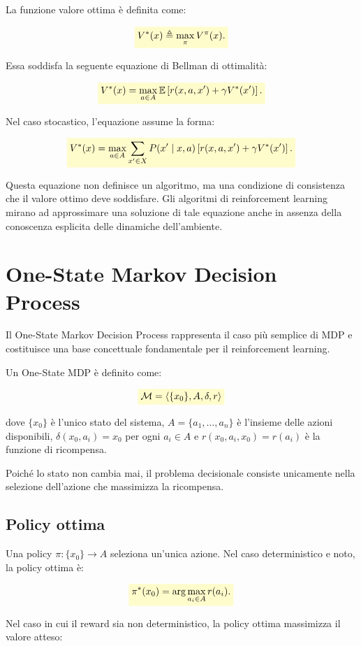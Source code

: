 \documentclass[a4paper,12pt]{report}
\newcommand{\highlight}[1]{%
\colorbox{yellow!20}{$\displaystyle #1$}%
}
\begin{document}
La funzione valore ottima è definita come:

\[
\highlight{
V^*(x) \triangleq \max_\pi V^\pi(x).}
\]

Essa soddisfa la seguente equazione di Bellman di ottimalità:

\[
\highlight{
V^*(x) =
\max_{a \in A}
\mathbb{E}\left[
r(x, a, x') + \gamma V^*(x')
\right].}
\]

Nel caso stocastico, l'equazione assume la forma:

\[
\highlight{
V^*(x) =
\max_{a \in A}
\sum_{x' \in X}
P(x' \mid x, a)
\left[
r(x, a, x') + \gamma V^*(x')
\right].}
\]

Questa equazione non definisce un algoritmo, ma una condizione di
consistenza che il valore ottimo deve soddisfare. Gli algoritmi di
reinforcement learning mirano ad approssimare una soluzione di tale
equazione anche in assenza della conoscenza esplicita delle dinamiche
dell'ambiente.

\section{One-State Markov Decision Process}

Il One-State Markov Decision Process rappresenta il caso più semplice
di MDP e costituisce una base concettuale fondamentale per il
reinforcement learning.

Un One-State MDP è definito come:

\[
\highlight{
\mathcal{M} = \langle \{x_0\}, A, \delta, r \rangle}
\]

dove $\{x_0\}$ è l'unico stato del sistema, $A = \{a_1, \dots, a_n\}$
è l'insieme delle azioni disponibili,
$\delta(x_0, a_i) = x_0$ per ogni $a_i \in A$ e
$r(x_0, a_i, x_0) = r(a_i)$ è la funzione di ricompensa.

Poiché lo stato non cambia mai, il problema decisionale consiste
unicamente nella selezione dell'azione che massimizza la ricompensa.

\subsection{Policy ottima}

Una policy $\pi : \{x_0\} \rightarrow A$ seleziona un'unica azione.
Nel caso deterministico e noto, la policy ottima è:

\[
\highlight{
\pi^*(x_0) = \arg\max_{a_i \in A} r(a_i).}
\]

Nel caso in cui il reward sia non deterministico, la policy ottima
massimizza il valore atteso:
\end{document}
